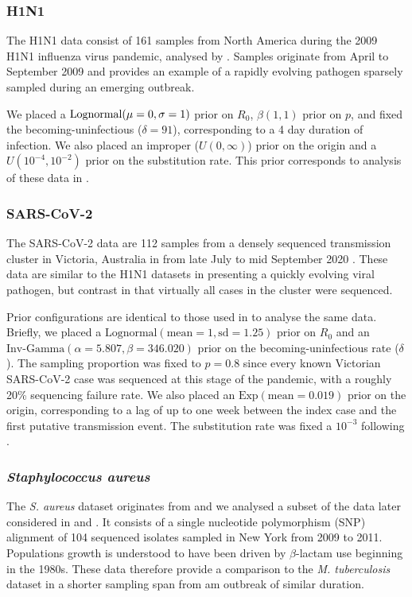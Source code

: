 \documentclass{article}
\begin{document}
\begin{spacing}{1.5}
\subsubsection*{H1N1}
The H1N1 data consist of 161 samples from North America during the 2009 H1N1 influenza virus pandemic, analysed by \citet{hedge_2013_real-time}. Samples originate from April to September 2009 and provides an example of a rapidly evolving pathogen sparsely sampled during an emerging outbreak. 

We placed a $\textnormal{Lognormal}(\mu=0,\sigma=1)$ prior on $R_0$, $\beta(1,1)$ prior on $p$, and fixed the becoming-uninfectious ($\delta = 91$), corresponding to a 4 day duration of infection. We also placed an improper ($U(0,\infty)$) prior on the origin and a $U(10^{-4},10^{-2})$ prior on the substitution rate. This prior corresponds to analysis of these data in \citet{featherstone_decoding_2023}.

\subsubsection*{SARS-CoV-2}
The SARS-CoV-2 data are 112 samples from a densely sequenced transmission cluster in Victoria, Australia in from late July to mid September 2020 \citet{lane2021genomics}. These data are similar to the H1N1 datasets in presenting a quickly evolving viral pathogen, but contrast in that virtually all cases in the cluster were sequenced. 

Prior configurations are identical to those used in \citet{featherstone_decoding_2023} to analyse the same data. Briefly, we placed a $\textrm{Lognormal}(\textrm{mean}=1, \textrm{sd}=1.25)$ prior on $R_0$ and an $\textrm{Inv-Gamma}(\alpha=5.807, \beta=346.020)$ prior on the becoming-uninfectious rate ($\delta$).  The sampling proportion was fixed to $p=0.8$ since every known Victorian SARS-CoV-2 case was sequenced at this stage of the pandemic, with a roughly 20\% sequencing failure rate. We also placed an $\textrm{Exp}(\textrm{mean}=0.019)$ prior on the origin, corresponding to a lag of up to one week  between the index case and the first putative transmission event. The substitution rate was fixed a $10^{-3}$ following \citep{duchene_temporal_2020}.

\subsubsection*{\textit{Staphylococcus aureus}}
The \textit{S. aureus} dataset originates from \citet{uhlemann_molecular_2014} and we analysed a subset of the data later considered in \citet{duchene_2016_genome} and \citet{volz_modeling_2018}. It consists of a single nucleotide polymorphism (SNP) alignment of 104 sequenced isolates sampled in New York from 2009 to 2011. Populations growth is understood to have been driven by $\beta$-lactam use beginning in the 1980s. These data therefore provide a comparison to the \textit{M. tuberculosis} dataset in a shorter sampling span from am outbreak of similar duration.


\end{spacing}
\end{document}
